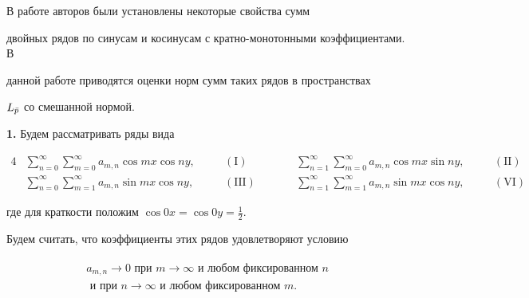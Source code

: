  


 




 


\maketitle 


 




 


 


 


В работе авторов \cite{Vu1} были установлены некоторые свойства сумм 


двойных рядов по синусам и косинусам с кратно-монотонными коэффициентами. В 


данной работе приводятся оценки норм сумм таких рядов в пространствах 


$L_{\Bar p}$ со смешанной нормой. 


 


{\bf 1.} Будем рассматривать ряды вида 


\begin{alignat*}{4} 


& \sum^\infty_{n=0} 


\sum^\infty_{m=0}a_{m,n}\cos mx\cos ny, &\quad &\mathrm{(I)} & \qquad 


& \sum^\infty_{n=1} 


\sum^\infty_{m=0}a_{m,n}\cos mx\sin ny, &\quad &\mathrm{(II)}\\ 


% 


& \sum^\infty_{n=0} 


\sum^\infty_{m=1}a_{m,n}\sin mx\cos ny, &\quad &\mathrm{(III)} &\qquad 


& \sum^\infty_{n=1} 


\sum^\infty_{m=1}a_{m,n}\sin mx\cos ny, &\quad &\mathrm{(VI)} 


\end{alignat*}


где для краткости положим $\cos 0x=\cos 0y=\frac{1}{2}$. 


Будем считать, что коэффициенты этих рядов удовлетворяют условию 


\begin{gather} 


\begin{split} 


a_{m,n}\to 0 \text{ при } m\to\infty \text{ и любом фиксированном } n \\


\text{ и при } n\to\infty \text{ и любом фиксированном } m.


\end{split} 


\end{gather} 


